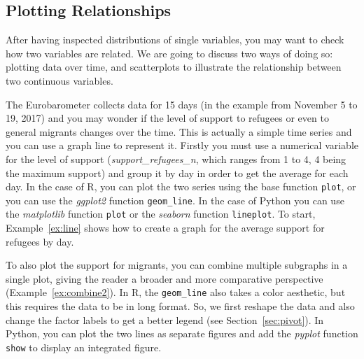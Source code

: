 



\subsection{Plotting Relationships}\label{sec:plotrelation}

After having inspected distributions of single variables, you may want to check how two variables are related. We are going to discuss two ways of doing so: plotting data over time, and scatterplots to illustrate the relationship between two continuous variables.

The Eurobarometer collects data for 15 days (in the example from November 5 to 19, 2017) and you may wonder if the level of support to refugees or even to general migrants changes over the time. This is actually a simple time series and you can use a graph line to represent it. Firstly you must use a numerical variable for the level of support (\emph{support\_refugees\_n}, which ranges from 1 to 4, 4 being the maximum support) and group it by day in order to get the average for each day. In the case of R, you can plot the two series using the base function \texttt{plot}, or you can use the \emph{ggplot2} function \texttt{geom\_line}. In the case of Python you can use the \emph{matplotlib} function \texttt{plot} or the \emph{seaborn} function \texttt{lineplot}. To start, Example~\ref{ex:line} shows how to create a graph for the average support for refugees by day.



To also plot the support for migrants, you can combine multiple subgraphs in a single plot,
giving the reader a broader and more comparative perspective (Example~\ref{ex:combine2}).
In R, the \texttt{geom\_line} also takes a color aesthetic, but this requires the data to be in long format.
So, we first reshape the data and also change the factor labels to get a better legend (see Section~\ref{sec:pivot}).
In Python, you can plot the two lines as separate figures  and add the \emph{pyplot} function \texttt{show} to display an integrated figure.

